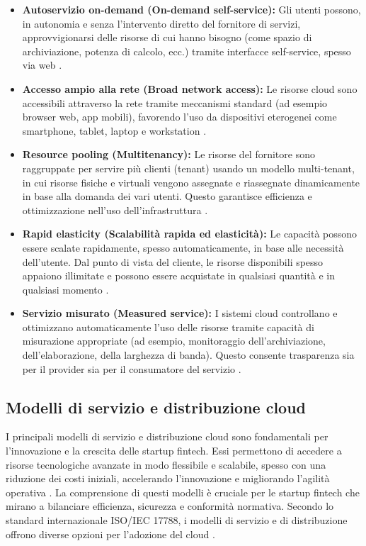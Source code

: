 \begin{itemize}
  \item \textbf{Autoservizio on-demand (On-demand self-service):} Gli utenti possono, in autonomia e senza l'intervento diretto del fornitore di servizi, approvvigionarsi delle risorse di cui hanno bisogno (come spazio di archiviazione, potenza di calcolo, ecc.) tramite interfacce self-service, spesso via web \cite{nist800-145}.

  \item \textbf{Accesso ampio alla rete (Broad network access):} Le risorse cloud sono accessibili attraverso la rete tramite meccanismi standard (ad esempio browser web, app mobili), favorendo l'uso da dispositivi eterogenei come smartphone, tablet, laptop e workstation \cite{nist800-145}.

  \item \textbf{Resource pooling (Multitenancy):} Le risorse del fornitore sono raggruppate per servire più clienti (tenant) usando un modello multi-tenant, in cui risorse fisiche e virtuali vengono assegnate e riassegnate dinamicamente in base alla domanda dei vari utenti. Questo garantisce efficienza e ottimizzazione nell'uso dell'infrastruttura \cite{nist800-145}.

  \item \textbf{Rapid elasticity (Scalabilità rapida ed elasticità):} Le capacità possono essere scalate rapidamente, spesso automaticamente, in base alle necessità dell'utente. Dal punto di vista del cliente, le risorse disponibili spesso appaiono illimitate e possono essere acquistate in qualsiasi quantità e in qualsiasi momento \cite{nist800-145}.

  \item \textbf{Servizio misurato (Measured service):} I sistemi cloud controllano e ottimizzano automaticamente l'uso delle risorse tramite capacità di misurazione appropriate (ad esempio, monitoraggio dell'archiviazione, dell'elaborazione, della larghezza di banda). Questo consente trasparenza sia per il provider sia per il consumatore del servizio \cite{nist800-145}.
\end{itemize}



\subsection{Modelli di servizio e distribuzione cloud}

I principali modelli di servizio e distribuzione cloud sono fondamentali per l'innovazione e la crescita delle startup fintech. Essi permettono di accedere a risorse tecnologiche avanzate in modo flessibile e scalabile, spesso con una riduzione dei costi iniziali, accelerando l'innovazione e migliorando l'agilità operativa \cite{vats2024systematic, hrmars2025cloud}. La comprensione di questi modelli è cruciale per le startup fintech che mirano a bilanciare efficienza, sicurezza e conformità normativa. Secondo lo standard internazionale ISO/IEC 17788, i modelli di servizio e di distribuzione offrono diverse opzioni per l'adozione del cloud \cite{iso2018overview}.

